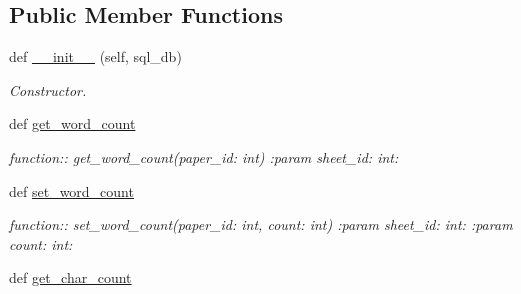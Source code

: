 \subsection*{Public Member Functions}
\begin{DoxyCompactItemize}
\item 
def \hyperlink{classplume-creator_1_1src_1_1plume_1_1data_1_1tree_1_1sheet__tree_1_1_sheet_tree_a811bf413211be8f9b29f066e3345ccab}{\+\_\+\+\_\+init\+\_\+\+\_\+} (self, sql\+\_\+db)\hypertarget{classplume-creator_1_1src_1_1plume_1_1data_1_1tree_1_1sheet__tree_1_1_sheet_tree_a811bf413211be8f9b29f066e3345ccab}{}\label{classplume-creator_1_1src_1_1plume_1_1data_1_1tree_1_1sheet__tree_1_1_sheet_tree_a811bf413211be8f9b29f066e3345ccab}

\begin{DoxyCompactList}\small\item\em Constructor. \end{DoxyCompactList}\item 
def \hyperlink{classplume-creator_1_1src_1_1plume_1_1data_1_1tree_1_1sheet__tree_1_1_sheet_tree_aa4bcf3df64c31dc1b2bf801993cb5a84}{get\+\_\+word\+\_\+count}\hypertarget{classplume-creator_1_1src_1_1plume_1_1data_1_1tree_1_1sheet__tree_1_1_sheet_tree_aa4bcf3df64c31dc1b2bf801993cb5a84}{}\label{classplume-creator_1_1src_1_1plume_1_1data_1_1tree_1_1sheet__tree_1_1_sheet_tree_aa4bcf3df64c31dc1b2bf801993cb5a84}

\begin{DoxyCompactList}\small\item\em function\+:\+: get\+\_\+word\+\_\+count(paper\+\_\+id\+: int) \+:param sheet\+\_\+id\+: int\+: \end{DoxyCompactList}\item 
def \hyperlink{classplume-creator_1_1src_1_1plume_1_1data_1_1tree_1_1sheet__tree_1_1_sheet_tree_a5b11c419558f1d15775ac2682cdbf508}{set\+\_\+word\+\_\+count}\hypertarget{classplume-creator_1_1src_1_1plume_1_1data_1_1tree_1_1sheet__tree_1_1_sheet_tree_a5b11c419558f1d15775ac2682cdbf508}{}\label{classplume-creator_1_1src_1_1plume_1_1data_1_1tree_1_1sheet__tree_1_1_sheet_tree_a5b11c419558f1d15775ac2682cdbf508}

\begin{DoxyCompactList}\small\item\em function\+:\+: set\+\_\+word\+\_\+count(paper\+\_\+id\+: int, count\+: int) \+:param sheet\+\_\+id\+: int\+: \+:param count\+: int\+: \end{DoxyCompactList}\item 
def \hyperlink{classplume-creator_1_1src_1_1plume_1_1data_1_1tree_1_1sheet__tree_1_1_sheet_tree_afc9d77fcb44437d64a3c9ba47f40a1f4}{get\+\_\+char\+\_\+count}\hypertarget{classplume-creator_1_1src_1_1plume_1_1data_1_1tree_1_1sheet__tree_1_1_sheet_tree_afc9d77fcb44437d64a3c9ba47f40a1f4}{}\label{classplume-creator_1_1src_1_1plume_1_1data_1_1tree_1_1sheet__tree_1_1_sheet_tree_afc9d77fcb44437d64a3c9ba47f40a1f4}


\end{DoxyCompactItemize}
